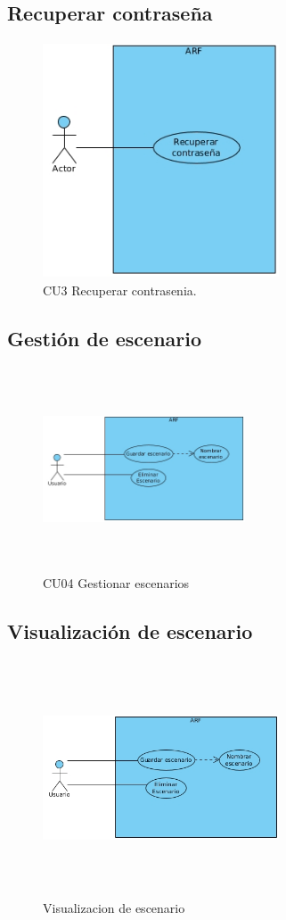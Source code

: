 \subsection{Recuperar contraseña} 
\begin{figure}[h!]
	\centering
	\includegraphics[width=7cm,height=7cm]{imagenes/analisis/recuperarContrasenia.jpg}
	\caption{CU3 Recuperar contrasenia.\cite{B27}}
	\label{fig:analogo}
\end{figure} \par \vspace{5mm}
\subsection{Gestión de escenario} 
\begin{figure}[h!]
	\centering
	\includegraphics[width=6cm,height=6cm]{imagenes/analisis/Escenario.jpg}
	\caption{CU04 Gestionar escenarios\cite{B27}}
	\label{fig:analogo}
\end{figure}
\par \vspace{5mm}
\subsection{Visualización de escenario} 
\begin{figure}[h!]
	\centering
	\includegraphics[width=7cm,height=7cm]{imagenes/analisis/Escenario.jpg}
	\caption{Visualizacion de escenario \cite{B27}}
	\label{fig:analogo}
\end{figure} \par \vspace{5mm}
